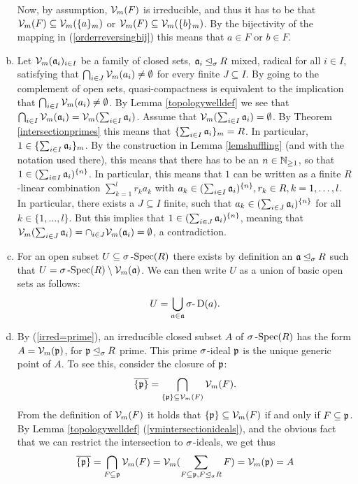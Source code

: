 \begin{prop}
\begin{bew}
\begin{enumerate}[(a)]
Now, by assumption, $\mathcal{V}_m(F)$ is irreducible, and thus it has to be that $\mathcal{V}_m(F) \subseteq \mathcal{V}_m(\{a\}_{m})$ or $\mathcal{V}_m(F) \subseteq \mathcal{V}_m(\{b\}_m)$. By the bijectivity of the mapping in (\ref{orderreversingbij}) this means that $a \in F$ or $b \in F$.
\item Let $\mathcal{V}_m(\mathfrak{a}_i)_{i \in I}$ be a family of closed sets, $\mathfrak{a}_i \unlhd_{\sigma} R$ mixed, radical for all $i \in I$, satisfying that 
$\bigcap_{i \in J} \mathcal{V}_m( a_i) \neq \emptyset$ for every finite $J \subseteq I$. By  going to the complement of open sets, quasi-compactness is equivalent to the implication that $\bigcap_{i \in I} \mathcal{V}_m(a_i) \neq \emptyset$.
By Lemma \ref{topologywelldef} we see that $\bigcap_{i \in I} \mathcal{V}_m( \mathfrak{a}_i) = \mathcal{V}_m ( \sum_{i \in I} \mathfrak{a}_i)$. Assume that $ \mathcal{V}_m ( \sum_{i \in I} \mathfrak{a}_i) = \emptyset$. 
By Theorem \ref{intersectionprimes} this means that $\{ \sum_{i \in I} \mathfrak{a}_i \}_m = R$. In particular, $1 \in \{ \sum_{i \in I} \mathfrak{a}_i \}_m$. By the construction in Lemma \ref{lemshuffling} (and with the notation used there), this means that there has to be an $n \in \mathbb{N}_{\geq1}$,
so that $1 \in (\sum_{i \in I} \mathfrak{a}_i )^{\{n\}}$. In particular, this means that $1$ can be written as a finite $R$-linear combination $\sum_{k=1}^l r_k a_k$ with $a_k \in (\sum_{i \in I} \mathfrak{a}_i )^{\{n\}}, r_k \in R, k = 1,\ldots,l$. In particular, there exists a $J \subseteq I$ finite,
such that $a_k \in (\sum_{i \in J} \mathfrak{a}_i )^{\{n\}}$ for all $k \in \{1, \ldots, l \}$. But this implies that $1 \in (\sum_{i \in J} \mathfrak{a}_i)^{\{n\}}$, meaning that $\mathcal{V}_m(\sum_{i \in J} \mathfrak{a}_i) = \cap_{i \in J} \mathcal{V}_m(\mathfrak{a}_i) = \emptyset$, a contradiction. 
\item For an open subset $U \subseteq \sigma\operatorname{-Spec}(R)$ there exists by definition an $\mathfrak{a} \unlhd_{\sigma} R$ such that $U = \sigma\operatorname{-Spec}(R) \setminus \mathcal{V}_m(\mathfrak{a})$. We can then write $U$ as a union of basic open sets as follows: $$U = \bigcup_{a \in \mathfrak{a}} \sigma\text{-}\operatorname{D}(a).$$
\item By (\ref{irred=prime}), an irreducible closed subset $A$ of $\sigma\operatorname{-Spec}(R)$ has the form $A = \mathcal{V}_m(\mathfrak{p})$, for $\mathfrak{p} \unlhd_{\sigma} R$ prime. This prime $\sigma$-ideal $\mathfrak{p}$ is the unique generic point of $A$.
To see this, consider the closure of $\mathfrak{p}$: $$\overline{\{\mathfrak{p}\}} = \bigcap_{\{\mathfrak{p}\} \subseteq \mathcal{V}_m(F)}\mathcal{V}_m(F).$$ From the definition of $\mathcal{V}_m(F)$ it holds that $\{\mathfrak{p}\} \subseteq \mathcal{V}_m(F)$ if and only if $F \subseteq \mathfrak{p}$. By Lemma \ref{topologywelldef} (\ref{vmintersectionideals}), and the obvious fact that we can restrict the intersection to $\sigma$-ideals, we get thus
\[ \overline{\{\mathfrak{p}\}} = \bigcap_{F \subseteq \mathfrak{p}}\mathcal{V}_m(F) = \mathcal{V}_m(\sum_{F \subseteq \mathfrak{p}, F \unlhd_{\sigma} R} F) = \mathcal{V}_m(\mathfrak{p}) = A \]
\end{enumerate}
\end{bew}
\end{prop}

\clearpage
